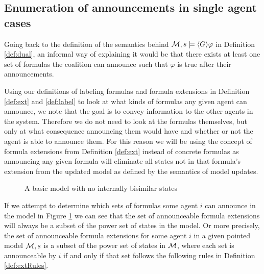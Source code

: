 
\subsection{Enumeration of announcements in single agent cases}

Going back to the definition of the semantics behind $\mathcal{M},s \models \langle G\rangle\varphi$ in Definition \ref{def:dual}, an informal way of explaining it would be that there exists at least one set of formulas the coalition can announce such that $\varphi$ is true after their announcements. 

Using our definitions of labeling formulas and formula extensions in Definition \ref{def:ext} and \ref{def:label} to look at what kinds of formulas any given agent can announce, we note that the goal is to convey information to the other agents in the system. Therefore we do not need to look at the formulas themselves, but only at what consequence announcing them would have and whether or not the agent is able to announce them. For this reason we will be using the concept of formula extensions from Definition \ref{def:ext} instead of concrete formulas as announcing any given formula will eliminate all states not in that formula's extension from the updated model as defined by the semantics of model updates.

\begin{figure}[h]
	\label{fig:GAexample}
	\caption{A basic model with no internally bisimilar states}
	\centering
\end{figure}

If we attempt to determine which sets of formulas some agent $i$ can announce in the model in Figure \ref{fig:GAexample} we can see that the set of announceable formula extensions will always be a subset of the power set of states in the model. Or more precisely, the set of announceable formula extensions for some agent $i$ in a given pointed model $\mathcal{M},s$ is a subset of the power set of states in $\mathcal{M}$, where each set is announceable by $i$ if and only if that set follows the following rules in Definition \ref{def:extRules}.

